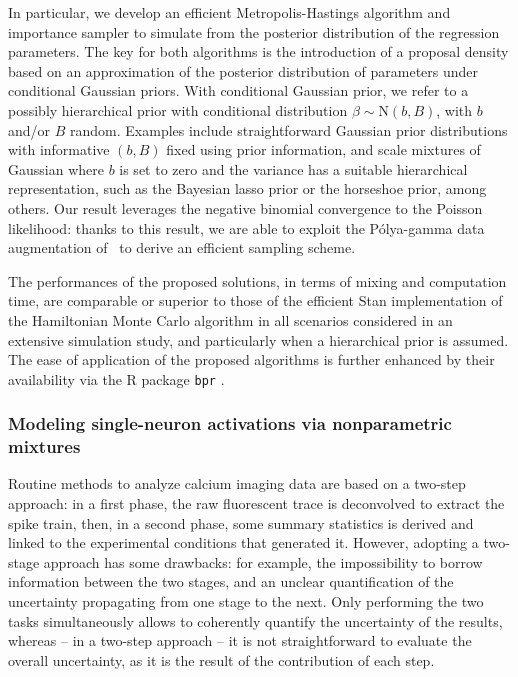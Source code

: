 In particular, we develop an efficient Metropolis-Hastings algorithm and importance sampler to simulate from the posterior distribution of the regression parameters.
The key for both algorithms is the introduction of a proposal density based on an approximation of the posterior distribution of parameters under conditional Gaussian priors. 
With conditional Gaussian prior, we refer to a possibly hierarchical prior with conditional distribution $\beta \sim \mathrm{N}(b, B)$, with $b$ and/or $B$ random. Examples include straightforward Gaussian prior distributions with informative $(b,B)$ fixed using prior information, and scale mixtures of Gaussian where $b$ is set to zero and the variance has a suitable hierarchical representation, such as the Bayesian lasso prior or the horseshoe prior, among others.
Our result leverages the negative binomial convergence to
the Poisson likelihood: thanks to this result, we are able to exploit the P\'olya-gamma data augmentation of~\citet{polson_scott_2013} to derive an efficient sampling scheme. 

The performances of the proposed solutions, in terms of mixing and computation time, are comparable or superior to those of the efficient Stan implementation of the Hamiltonian Monte Carlo algorithm in all scenarios considered in an extensive simulation study, and particularly when a hierarchical prior is assumed. 
The ease of application of the proposed algorithms is further enhanced by their availability via the R package \texttt{bpr} \citep{bpr}.


\subsubsection{Modeling single-neuron activations via nonparametric mixtures}
Routine methods to analyze calcium imaging data are based on a two-step approach: in a first phase, the raw fluorescent trace is deconvolved to extract the spike train, then, in a second phase, some summary statistics is derived and linked to the experimental conditions that generated it.
However, adopting a two-stage approach has some drawbacks: for example, the impossibility to borrow information between the two stages, and an unclear quantification of the uncertainty propagating from one stage to the next. Only performing the two tasks simultaneously allows to coherently quantify the uncertainty of the results, whereas -- in a two-step approach -- it is not straightforward to evaluate the overall uncertainty, as it is the result of the contribution of each step. 

